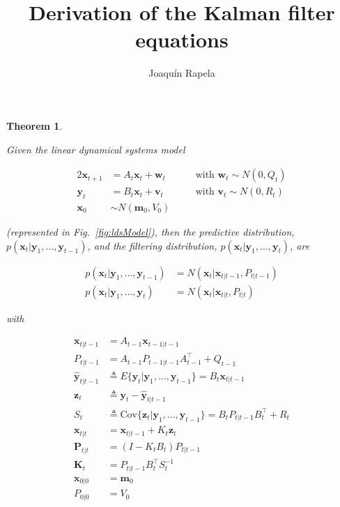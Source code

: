 \documentclass[12pt]{article}
\title{Derivation of the Kalman filter equations}
\author{Joaquín Rapela}
\newtheorem{theorem}{Theorem}
\begin{document}
\maketitle

\begin{theorem}
	\label{thm:kalmanFilterEqs}

    Given the linear dynamical systems model

    \begin{alignat*}{2}
        \mathbf{x}_{t+1}&=A_t\mathbf{x}_t+\mathbf{w}_t&\quad&\text{with }\mathbf{w}_t\sim N(0,Q_t)\\
        \mathbf{y}_t&=B_t\mathbf{x}_t+\mathbf{v}_t&&\text{with }\mathbf{v}_t\sim N(0,R_t)\\
        \mathbf{x}_0&\sim N(\mathbf{m}_0,V_0)&&
    \end{alignat*}

    \noindent (represented in Fig.~\ref{fig:ldsModel}), then the predictive
    distribution, $p(\mathbf{x}_t|\mathbf{y}_1,\ldots,\mathbf{y}_{t-1})$, and
    the filtering distribution,
    $p(\mathbf{x}_t|\mathbf{y}_1,\ldots,\mathbf{y}_t)$, are

    \begin{align*}
        p(\mathbf{x}_t|\mathbf{y}_1,\ldots,\mathbf{y}_{t-1})&=N(\mathbf{x}_t|\mathbf{x}_{t|t-1},P_{t|t-1})\\
        p(\mathbf{x}_t|\mathbf{y}_1,\ldots,\mathbf{y}_t)&=N(\mathbf{x}_t|\mathbf{x}_{t|t},P_{t|t})
    \end{align*}

    \noindent with

    \begin{align}
        \mathbf{x}_{t|t-1}&=A_{t-1}\mathbf{x}_{t-1|t-1}\label{eq:xtGtm1}\\
        P_{t|t-1}&=A_{t-1}P_{t-1|t-1}A_{t-1}^\intercal+Q_{t-1}\label{eq:PtGtm1}\\
        \hat{\mathbf{y}}_{t|t-1}&\triangleq E\{\mathbf{y}_t|\mathbf{y}_1,\ldots,\mathbf{y}_{t-1}\}=B_t\mathbf{x}_{t|t-1}\label{eq:ytGtm1}\\
        \mathbf{z}_t&\triangleq\mathbf{y}_t-\hat{\mathbf{y}}_{t|t-1}\nonumber\\
        S_t&\triangleq \text{Cov}\{\mathbf{z}_t|\mathbf{y}_1,\ldots,\mathbf{y}_{t-1}\}=B_tP_{t|t-1}B_t^\intercal+R_t\label{eq:St}\\
        \mathbf{x}_{t|t}&=\mathbf{x}_{t|t-1}+K_t\mathbf{z}_t\label{eq:xtGt}\\
        \mathbf{P}_{t|t}&=(I-K_tB_t)P_{t|t-1}\label{eq:PtGt}\\
        \mathbf{K}_t&=P_{t|t-1}B_t^\intercal S_t^{-1}\label{eq:Kt}\\
        \mathbf{x}_{0|0}&=\mathbf{m}_0\label{eq:x0G0}\\
        P_{0|0}&=V_0\label{eq:P0G0}
    \end{align}
\end{theorem}
\end{document}
